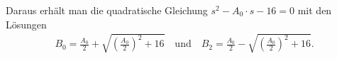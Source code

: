\documentclass[11pt]{article}
\newcommand{\br}[1]{\ensuremath{\left(#1\right)}}
\begin{document}

Daraus erhält man die quadratische Gleichung $s^{2}- A_{0} \cdot s - 16 = 0$
mit den Lösungen
\begin{gather*}
  B_0 = \frac{A_0}{2}+ \sqrt{\br{\frac{A_0}{2}}^2+16}\quad\text{und}\quad B_2
  = \frac{A_0}{2}- \sqrt{\br{\frac{A_0}{2}}^2+16}.
\end{gather*}

\newpage


\end{document}
